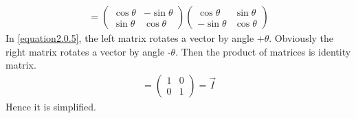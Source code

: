 \documentclass[journal,12pt,twocolumn]{IEEEtran}
\begin{document}
\begin{align}\label{equation2.0.5}
    =\left(\begin{array}{cc}\cos\theta & -\sin\theta \\ \sin\theta & \cos\theta\end{array}\right)\left(\begin{array}{cc}\cos\theta & \sin\theta \\ -\sin\theta & \cos\theta\end{array}\right)
\end{align}
In \eqref{equation2.0.5}, the left matrix rotates a vector by angle +$\theta$. Obviously the right matrix rotates a vector by angle -$\theta$. Then the product of matrices is identity matrix.
\begin{align}
    =\left(\begin{array}{cc} 1 & 0 \\ 0 & 1\end{array}\right)=\vec{I}
\end{align}
Hence it is simplified.
\end{document}
